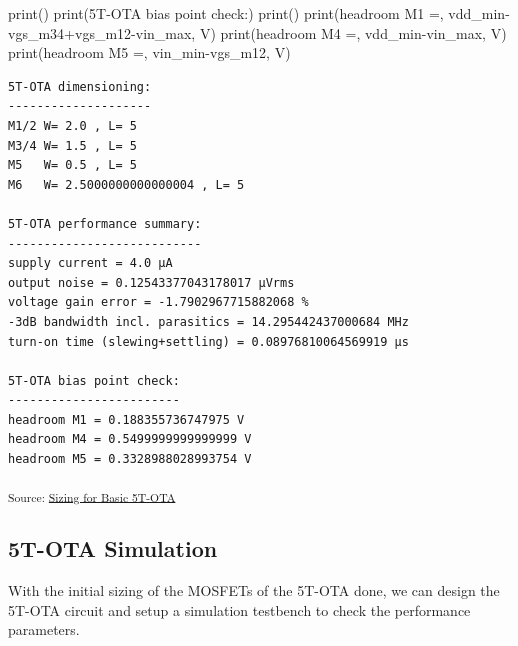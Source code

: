 \documentclass[
  a4paper,
  DIV=11,
  numbers=noendperiod]{scrartcl}
\newenvironment{Shaded}{\begin{snugshade}}{\end{snugshade}}
\newcommand{\BuiltInTok}[1]{\textcolor[rgb]{0.00,0.23,0.31}{#1}}
\newcommand{\NormalTok}[1]{\textcolor[rgb]{0.00,0.23,0.31}{#1}}
\newcommand{\OperatorTok}[1]{\textcolor[rgb]{0.37,0.37,0.37}{#1}}
\newcommand{\StringTok}[1]{\textcolor[rgb]{0.13,0.47,0.30}{#1}}
\begin{document}
\begin{tcolorbox}
\begin{Shaded}
\begin{Highlighting}[]
\BuiltInTok{print}\NormalTok{()}
\BuiltInTok{print}\NormalTok{(}\StringTok{\textquotesingle{}5T{-}OTA bias point check:\textquotesingle{}}\NormalTok{)}
\BuiltInTok{print}\NormalTok{(}\StringTok{\textquotesingle{}{-}{-}{-}{-}{-}{-}{-}{-}{-}{-}{-}{-}{-}{-}{-}{-}{-}{-}{-}{-}{-}{-}{-}{-}\textquotesingle{}}\NormalTok{)}
\BuiltInTok{print}\NormalTok{(}\StringTok{\textquotesingle{}headroom M1 =\textquotesingle{}}\NormalTok{, vdd\_min}\OperatorTok{{-}}\NormalTok{vgs\_m34}\OperatorTok{+}\NormalTok{vgs\_m12}\OperatorTok{{-}}\NormalTok{vin\_max, }\StringTok{\textquotesingle{}V\textquotesingle{}}\NormalTok{)}
\BuiltInTok{print}\NormalTok{(}\StringTok{\textquotesingle{}headroom M4 =\textquotesingle{}}\NormalTok{, vdd\_min}\OperatorTok{{-}}\NormalTok{vin\_max, }\StringTok{\textquotesingle{}V\textquotesingle{}}\NormalTok{)}
\BuiltInTok{print}\NormalTok{(}\StringTok{\textquotesingle{}headroom M5 =\textquotesingle{}}\NormalTok{, vin\_min}\OperatorTok{{-}}\NormalTok{vgs\_m12, }\StringTok{\textquotesingle{}V\textquotesingle{}}\NormalTok{)}
\end{Highlighting}
\end{Shaded}

\begin{verbatim}
5T-OTA dimensioning:
--------------------
M1/2 W= 2.0 , L= 5
M3/4 W= 1.5 , L= 5
M5   W= 0.5 , L= 5
M6   W= 2.5000000000000004 , L= 5

5T-OTA performance summary:
---------------------------
supply current = 4.0 µA
output noise = 0.12543377043178017 µVrms
voltage gain error = -1.7902967715882068 %
-3dB bandwidth incl. parasitics = 14.295442437000684 MHz
turn-on time (slewing+settling) = 0.08976810064569919 µs

5T-OTA bias point check:
------------------------
headroom M1 = 0.188355736747975 V
headroom M4 = 0.5499999999999999 V
headroom M5 = 0.3328988028993754 V
\end{verbatim}

\textsubscript{Source:
\href{https://iic-jku.github.io/analog-circuit-design/sizing/sizing_basic_ota-preview.html\#cell-0}{Sizing
for Basic 5T-OTA}}

\end{tcolorbox}

\subsection{5T-OTA Simulation}\label{sec-basic-ota-simulation}

With the initial sizing of the MOSFETs of the 5T-OTA done, we can design
the 5T-OTA circuit and setup a simulation testbench to check the
performance parameters.
\end{document}
